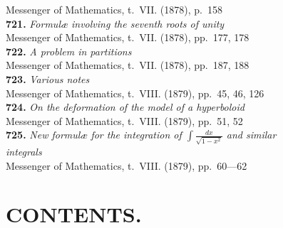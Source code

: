 \documentclass[11pt,a4paper]{book}
\begin{document}
\hspace*{2em}Messenger of Mathematics, t.~VII. (1878), p.~158\\[0.3em]
\textbf{721.} \textit{Formul\ae{} involving the seventh roots of unity} \\
\hspace*{2em}Messenger of Mathematics, t.~VII. (1878), pp.~177, 178\\[0.3em]
\textbf{722.} \textit{A problem in partitions} \\
\hspace*{2em}Messenger of Mathematics, t.~VII. (1878), pp.~187, 188\\[0.3em]
\textbf{723.} \textit{Various notes} \\
\hspace*{2em}Messenger of Mathematics, t.~VIII. (1879), pp.~45, 46, 126\\[0.3em]
\textbf{724.} \textit{On the deformation of the model of a hyperboloid} \\
\hspace*{2em}Messenger of Mathematics, t.~VIII. (1879), pp.~51, 52\\[0.3em]
\textbf{725.} \textit{New formul\ae{} for the integration of $\int \frac{dx}{\sqrt{1-x^2}}$ and similar}\\
\hspace*{2em}\textit{integrals} \\
\hspace*{2em}Messenger of Mathematics, t.~VIII. (1879), pp.~60---62

\cleardoublepage

\chapter*{CONTENTS.}
\end{document}
